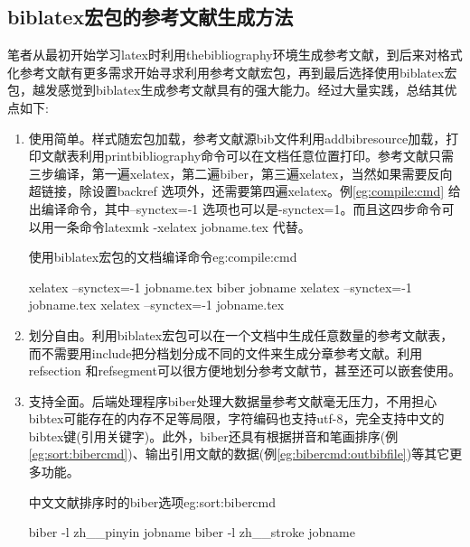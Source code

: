 \subsection{biblatex宏包的参考文献生成方法}
笔者从最初开始学习latex时利用thebibliography环境生成参考文献，到后来对格式化参考文献有更多需求开始寻求利用参考文献宏包，再到最后选择使用biblatex宏包，越发感觉到biblatex生成参考文献具有的强大能力。经过大量实践，总结其优点如下:
\begin{enumerate}
\item 使用简单。样式随宏包加载，参考文献源bib文件利用addbibresource加载，打印文献表利用printbibliography命令可以在文档任意位置打印。参考文献只需三步编译，第一遍xelatex，第二遍biber，第三遍xelatex，当然如果需要反向超链接，除设置backref 选项外，还需要第四遍xelatex。例\ref{eg:compile:cmd} 给出编译命令，其中--synctex=-1 选项也可以是-synctex=1。而且这四步命令可以用一条命令latexmk -xelatex jobname.tex 代替。

    \begin{example}{使用biblatex宏包的文档编译命令}{eg:compile:cmd}
    \begin{texlist}
    xelatex --synctex=-1 jobname.tex
    biber jobname
    xelatex --synctex=-1 jobname.tex
    xelatex --synctex=-1 jobname.tex
    \end{texlist}
    \end{example}

\item 划分自由。利用biblatex宏包可以在一个文档中生成任意数量的参考文献表，而不需要用include把分档划分成不同的文件来生成分章参考文献。利用refsection 和refsegment可以很方便地划分参考文献节，甚至还可以嵌套使用。

\item 支持全面。后端处理程序biber处理大数据量参考文献毫无压力，不用担心bibtex可能存在的内存不足等局限，字符编码也支持utf-8，完全支持中文的bibtex键(引用关键字)。此外，biber还具有根据拼音和笔画排序(例\ref{eg:sort:bibercmd})、输出引用文献的数据(例\ref{eg:bibercmd:outbibfile})等其它更多功能。

        \begin{example}{中文文献排序时的biber选项}{eg:sort:bibercmd}
        \begin{texlist}
        biber -l zh__pinyin jobname
        biber -l zh__stroke jobname
        \end{texlist}
        \end{example}


\end{enumerate}
